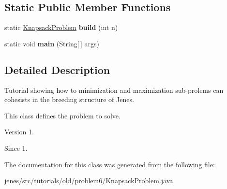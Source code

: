 \subsection*{Static Public Member Functions}
\begin{DoxyCompactItemize}
\item 
\hypertarget{classjenes_1_1tutorials_1_1old_1_1problem6_1_1_knapsack_problem_a8e9ae71984885743ff2892d4bff2727e}{static \hyperlink{classjenes_1_1tutorials_1_1old_1_1problem6_1_1_knapsack_problem}{Knapsack\-Problem} {\bfseries build} (int n)}\label{classjenes_1_1tutorials_1_1old_1_1problem6_1_1_knapsack_problem_a8e9ae71984885743ff2892d4bff2727e}

\item 
\hypertarget{classjenes_1_1tutorials_1_1old_1_1problem6_1_1_knapsack_problem_a135fb0906a4034fcd7be21c23f794953}{static void {\bfseries main} (String\mbox{[}$\,$\mbox{]} args)}\label{classjenes_1_1tutorials_1_1old_1_1problem6_1_1_knapsack_problem_a135fb0906a4034fcd7be21c23f794953}

\end{DoxyCompactItemize}


\subsection{Detailed Description}
Tutorial showing how to minimization and maximization sub-\/prolems can cohesists in the breeding structure of Jenes.

This class defines the problem to solve.

\begin{DoxyVersion}{Version}
1. 
\end{DoxyVersion}
\begin{DoxySince}{Since}
1. 
\end{DoxySince}


The documentation for this class was generated from the following file\-:\begin{DoxyCompactItemize}
\item 
jenes/src/tutorials/old/problem6/Knapsack\-Problem.\-java\end{DoxyCompactItemize}
